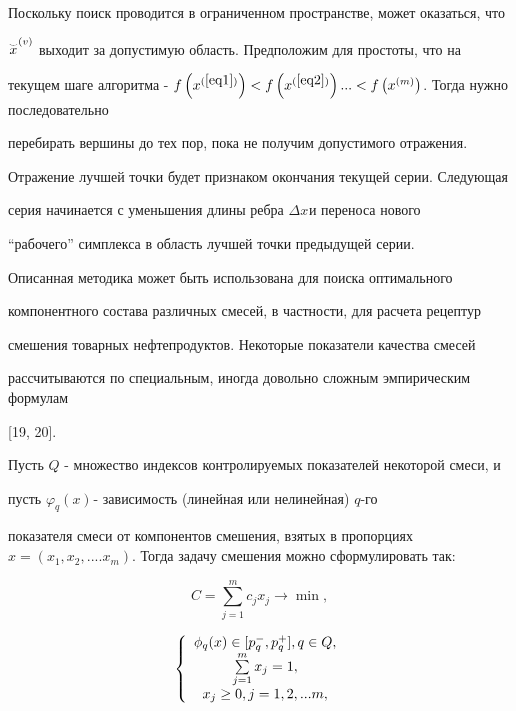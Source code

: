 \documentclass [12pt]{article}
\begin{document}
Поскольку поиск проводится в ограниченном пространстве, может оказаться, что 

$\mathord{\buildrel{\lower3pt\hbox{$\scriptscriptstyle\smile$}}\over {x}} 

^{(v)}$ выходит за допустимую область. Предположим для простоты, что на 

текущем шаге алгоритма - $f\left( {x^{(\ref{eq1})}} \right) < f\left( {x^{(\ref{eq2})}} 

\right)... < f\left( {x^{(m)}} \right)$. Тогда нужно последовательно 

перебирать вершины до тех пор, пока не получим допустимого отражения. 

Отражение лучшей точки будет признаком окончания текущей серии. Следующая 

серия начинается с уменьшения длины ребра $\Delta x_{ }$и переноса нового 

``рабочего'' симплекса в область лучшей точки предыдущей серии. 



Описанная методика может быть использована для поиска оптимального 

компонентного состава различных смесей, в частности, для расчета рецептур 

смешения товарных нефтепродуктов. Некоторые показатели качества смесей 

рассчитываются по специальным, иногда довольно сложным эмпирическим формулам 

[19, 20]. 



Пусть $Q$ - множество индексов контролируемых показателей некоторой смеси, и 

пусть $\varphi _q (x)_{ }$- зависимость (линейная или нелинейная) $q$-го 

показателя смеси от компонентов смешения, взятых в пропорциях $x = (x_1 ,x_2 

,....x_m )$. Тогда задачу смешения можно сформулировать так:





\[

C = \sum\limits_{j = 1}^m {c_j x_j } \to \min ,

\]









\[

\left\{ {{\begin{array}{*{20}c}

 {\phi _q (x) \in [p_q^ - ,p_q^ + ],q \in Q,} \\

 {\sum\limits_{j = 1}^m {x_j = 1,} } \\

 {x_j \ge 0,j = 1,2,...m,} \\

\end{array} }} \right.

\]
\end{document}

